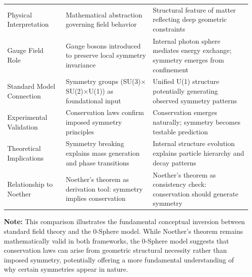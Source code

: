 \documentclass[%
 reprint,
 amsmath,amssymb,
 aps,
]{revtex4-1}
\numberwithin{equation}{section}%
\begin{document}
\begin{table}[t!]
\begin{tabular}{p{4.8cm}p{6.2cm}p{6.2cm}}
\addlinespace[0.3cm]
Physical Interpretation & Mathematical abstraction governing field behavior & Structural feature of matter reflecting deep geometric constraints \\
\addlinespace[0.3cm]
Gauge Field Role & Gauge bosons introduced to preserve local symmetry invariance & Internal photon sphere mediates energy exchange; symmetry emerges from confinement \\
\addlinespace[0.3cm]
Standard Model Connection & Symmetry groups (SU(3)$\times$SU(2)$\times$U(1)) as foundational input & Unified U(1) structure potentially generating observed symmetry patterns \\
\addlinespace[0.3cm]
Experimental Validation & Conservation laws confirm imposed symmetry principles & Conservation emerges naturally; symmetry becomes testable prediction \\
\addlinespace[0.3cm]
Theoretical Implications & Symmetry breaking explains mass generation and phase transitions & Internal structure evolution explains particle hierarchy and decay patterns \\
\addlinespace[0.3cm]
Relationship to Noether & Noether's theorem as derivation tool: symmetry implies conservation & Noether's theorem as consistency check: conservation should generate symmetry \\
\bottomrule
\end{tabular}
\vspace{0.2cm}
\begin{flushleft}
\footnotesize
\textbf{Note:} This comparison illustrates the fundamental conceptual inversion between standard field theory and the 0-Sphere model. While Noether's theorem remains mathematically valid in both frameworks, the 0-Sphere model suggests that conservation laws can arise from geometric structural necessity rather than imposed symmetry, potentially offering a more fundamental understanding of why certain symmetries appear in nature.
\end{flushleft}
\end{table}

\end{document}
